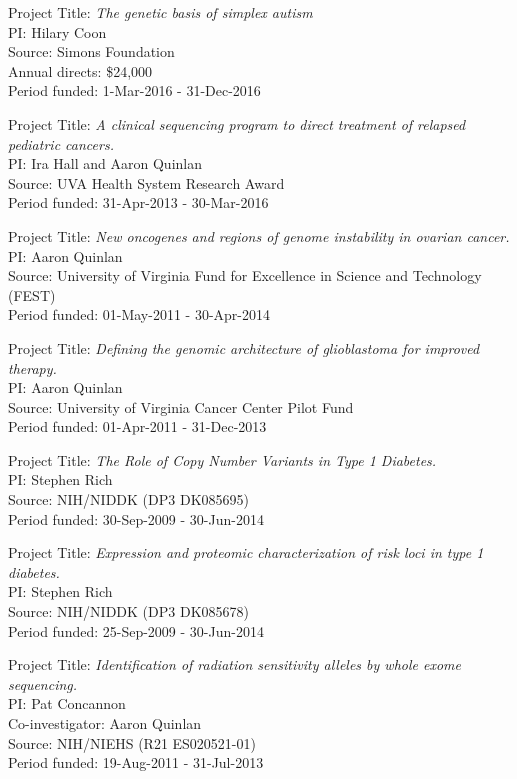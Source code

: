 \documentclass[margin,line]{cv}
\begin{document}
\begin{resume}
    Project Title: \textit{The genetic basis of simplex autism} \\
    PI: Hilary Coon \\
    Source: Simons Foundation \\
    Annual directs: \$24,000 \\
    Period funded: 1-Mar-2016 - 31-Dec-2016

    Project Title: \textit{A clinical sequencing program to direct treatment of relapsed pediatric cancers.} \\
    PI: Ira Hall and Aaron Quinlan \\
    Source: UVA Health System Research Award  \\
    Period funded: 31-Apr-2013 - 30-Mar-2016

    \vspace{-2mm}
    Project Title: \textit{New oncogenes and regions of genome instability in ovarian cancer.} \\
    PI: Aaron Quinlan \\
    Source: University of Virginia Fund for Excellence in Science and Technology (FEST) \\
    Period funded: 01-May-2011 - 30-Apr-2014

    \vspace{-2mm}
    Project Title: \textit{Defining the genomic architecture of glioblastoma for improved therapy.} \\
    PI: Aaron Quinlan \\
    Source: University of Virginia Cancer Center Pilot Fund\\
    Period funded: 01-Apr-2011 - 31-Dec-2013

    \vspace{-2mm}
    Project Title: \textit{The Role of Copy Number Variants in Type 1 Diabetes.} \\
    PI: Stephen Rich \\
    Source: NIH/NIDDK (DP3 DK085695)\\
    Period funded: 30-Sep-2009 - 30-Jun-2014

    \vspace{-2mm}
    Project Title: \textit{Expression and proteomic characterization of risk loci in type 1 diabetes.} \\
    PI: Stephen Rich \\
    Source: NIH/NIDDK (DP3 DK085678)\\
    Period funded: 25-Sep-2009 - 30-Jun-2014

    Project Title: \textit{Identification of radiation sensitivity alleles by whole exome sequencing.} \\
    PI: Pat Concannon \\
    Co-investigator: Aaron Quinlan \\
    Source: NIH/NIEHS (R21 ES020521-01) \\
    Period funded: 19-Aug-2011 - 31-Jul-2013


\end{resume}
\end{document}
